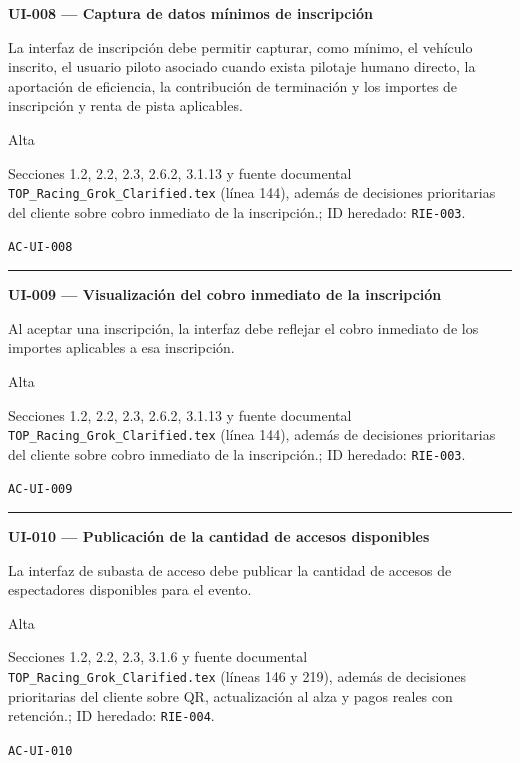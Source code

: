 \documentclass[10pt,letterpaper]{article}
\begin{document}
\noindent\textbf{UI-008 --- Captura de datos mínimos de inscripción}\par
\begin{description}[style=nextline,leftmargin=3.15cm,labelwidth=2.8cm,font=\normalfont\bfseries]
\item[Obligación] La interfaz de inscripción debe permitir capturar, como mínimo, el vehículo inscrito, el usuario piloto asociado cuando exista pilotaje humano directo, la aportación de eficiencia, la contribución de terminación y los importes de inscripción y renta de pista aplicables.
\item[Prioridad] Alta
\item[Procedencia] Secciones 1.2, 2.2, 2.3, 2.6.2, 3.1.13 y fuente documental \texttt{TOP\_Racing\_Grok\_Clarified.tex} (línea 144), además de decisiones prioritarias del cliente sobre cobro inmediato de la inscripción.; ID heredado: \texttt{RIE-003}.
\item[Verificación] \texttt{AC-UI-008}
\end{description}
\vspace{0.25em}\hrule\vspace{0.65em}
\noindent\textbf{UI-009 --- Visualización del cobro inmediato de la inscripción}\par
\begin{description}[style=nextline,leftmargin=3.15cm,labelwidth=2.8cm,font=\normalfont\bfseries]
\item[Obligación] Al aceptar una inscripción, la interfaz debe reflejar el cobro inmediato de los importes aplicables a esa inscripción.
\item[Prioridad] Alta
\item[Procedencia] Secciones 1.2, 2.2, 2.3, 2.6.2, 3.1.13 y fuente documental \texttt{TOP\_Racing\_Grok\_Clarified.tex} (línea 144), además de decisiones prioritarias del cliente sobre cobro inmediato de la inscripción.; ID heredado: \texttt{RIE-003}.
\item[Verificación] \texttt{AC-UI-009}
\end{description}
\vspace{0.25em}\hrule\vspace{0.65em}
\noindent\textbf{UI-010 --- Publicación de la cantidad de accesos disponibles}\par
\begin{description}[style=nextline,leftmargin=3.15cm,labelwidth=2.8cm,font=\normalfont\bfseries]
\item[Obligación] La interfaz de subasta de acceso debe publicar la cantidad de accesos de espectadores disponibles para el evento.
\item[Prioridad] Alta
\item[Procedencia] Secciones 1.2, 2.2, 2.3, 3.1.6 y fuente documental \texttt{TOP\_Racing\_Grok\_Clarified.tex} (líneas 146 y 219), además de decisiones prioritarias del cliente sobre QR, actualización al alza y pagos reales con retención.; ID heredado: \texttt{RIE-004}.
\item[Verificación] \texttt{AC-UI-010}
\end{description}
\end{document}
